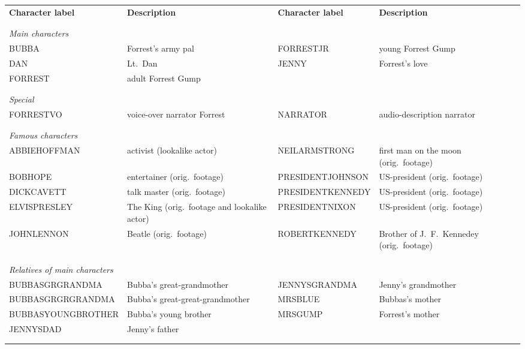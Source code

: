 \begin{table*}
  \centering
  \begin{tabular}{p{4cm}p{4cm}p{3.6cm}p{4cm}}
    \textbf{Character label} & \textbf{Description} & \textbf{Character label} & \textbf{Description} \\
\\\hline\\

\multicolumn{4}{l}{\textit{Main characters}} \\
BUBBA     & Forrest's army pal & FORRESTJR & young Forrest Gump \\
DAN       & Lt.~Dan & JENNY     & Forrest's love \\
FORREST   & adult Forrest Gump &           & \\
\\\hline\\

\multicolumn{4}{l}{\textit{Special}} \\
FORRESTVO & voice-over narrator Forrest & NARRATOR & audio-description narrator \\
\\\hline\\

\multicolumn{4}{l}{\textit{Famous characters}} \\
 ABBIEHOFFMAN     & activist (lookalike actor)                   & NEILARMSTRONG    & first man on the moon (orig.~footage) \\ 
 BOBHOPE          & entertainer (orig.~footage)                  & PRESIDENTJOHNSON & US-president (orig.~footage) \\
 DICKCAVETT       & talk master (orig.~footage)                  & PRESIDENTKENNEDY & US-president (orig.~footage) \\
 ELVISPRESLEY     & The King (orig.~footage and lookalike actor) & PRESIDENTNIXON   & US-president (orig.~footage)  \\
 JOHNLENNON       & Beatle (orig.~footage)                       & ROBERTKENNEDY    & Brother of J.~F.~Kennedey (orig.~footage) \\                  & \\
\\\hline\\

\multicolumn{4}{l}{\textit{Relatives of main characters}} \\
BUBBASGRGRANDMA   & Bubba's great-grandmother & JENNYSGRANDMA & Jenny's grandmother\\
BUBBASGRGRGRANDMA & Bubba's great-great-grand\-mother & MRSBLUE       & Bubbas's mother\\
BUBBASYOUNGBROTHER      & Bubba's young brother & MRSGUMP       & Forrest's mother \\
JENNYSDAD               & Jenny's father &              & \\
\\\hline\\


\end{tabular}
\end{table*}
